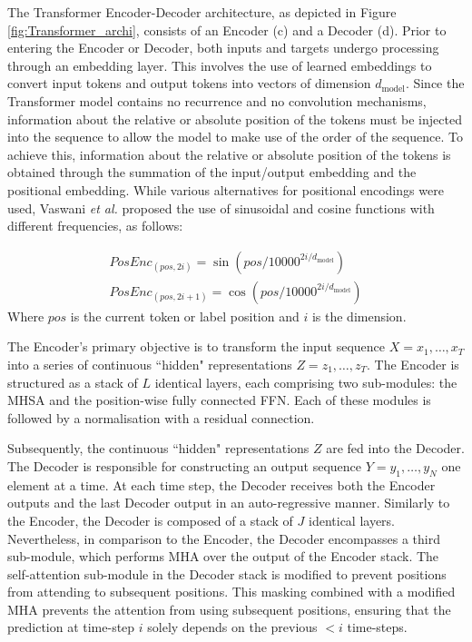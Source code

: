 The Transformer Encoder-Decoder architecture, as depicted in Figure \ref{fig:Transformer_archi}, consists of an Encoder (c) and a Decoder (d). Prior to entering the Encoder or Decoder, both inputs and targets undergo processing through an embedding layer. This involves the use of learned embeddings to convert input tokens and output tokens into vectors of dimension $d_{\text{model}}$. 
Since the Transformer model contains no recurrence and no convolution mechanisms, information about the relative or absolute position of the tokens must be injected into the sequence to allow the model to make use of the order of the sequence. To achieve this, information about the relative or absolute position of the tokens is obtained through the summation of the input/output embedding and the positional embedding. While various alternatives for positional encodings were used, Vaswani \textit{et al.} \cite{vaswani2017attention} proposed the use of sinusoidal and cosine functions with different frequencies, as follows:

\begin{align}
    PosEnc_{(pos,2i)} = \sin(pos/10000^{2i/d_{\text{model}}})\\
    PosEnc_{(pos,2i+1)} = \cos(pos/10000^{2i/d_{\text{model}}})
\end{align}
Where $pos$ is the current token or label position and $i$ is the dimension.
 

The Encoder's primary objective is to transform the input sequence $X = x_1, \dots, x_T$ into a series of continuous ``hidden" representations $Z = z_1, \dots, z_T$. The Encoder is structured as a stack of $L$ identical layers, each comprising two sub-modules: the \ac{MHSA} and the position-wise fully connected \ac{FFN}. Each of these modules is followed by a normalisation with a residual connection.

Subsequently, the continuous ``hidden" representations $Z$ are fed into the Decoder. The Decoder is responsible for constructing an output sequence $Y = y_1, \dots, y_N$ one element at a time. At each time step, the Decoder receives both the Encoder outputs and the last Decoder output in an auto-regressive manner. Similarly to the Encoder, the Decoder is composed of a stack of $J$ identical layers. Nevertheless, in comparison to the Encoder, the Decoder encompasses a third sub-module, which performs \ac{MHA} over the output of the Encoder stack. The self-attention sub-module in the Decoder stack is modified to prevent positions from attending to subsequent positions. This masking combined with a modified \ac{MHA} prevents the attention from using subsequent positions, ensuring that the prediction at time-step $i$ solely depends on the previous $< i$ time-steps.

